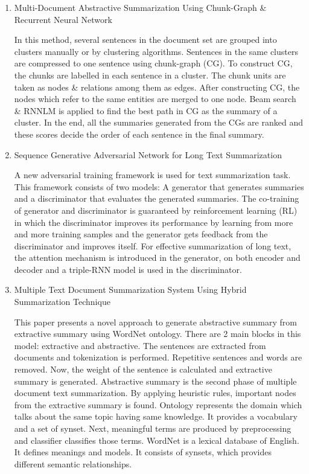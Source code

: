 \documentclass[11pt]{report}
\begin{document}
\begin{enumerate}
    \item Multi-Document Abstractive Summarization Using Chunk-Graph \& Recurrent Neural Network\cite{14}

    In this method, several sentences in the document set are grouped into clusters manually or by clustering algorithms. Sentences in the same clusters are compressed to one sentence using chunk-graph (CG). To construct CG, the chunks are labelled in each sentence in a cluster. The chunk units are taken as nodes \& relations among them as edges. After constructing CG, the nodes which refer to the same entities are merged to one node. Beam search \& RNNLM is applied to find the best path in CG as the summary of a cluster. In the end, all the summaries generated from the CGs are ranked and these scores decide the order of each sentence in the final summary. \\
    
    \item Sequence Generative Adversarial Network for Long Text Summarization\cite{15}

    A new adversarial training framework is used for text summarization task. This framework consists of two models: A generator that generates summaries and a discriminator that evaluates the generated summaries. The co-training of generator and discriminator is guaranteed by reinforcement learning (RL) in which the discriminator improves its performance by learning from more and more training samples and the generator gets feedback from the discriminator and improves itself. For effective summarization of long text, the attention mechanism is introduced in the generator, on both encoder and decoder and a triple-RNN model is used in the discriminator. \\

    \item Multiple Text Document Summarization System Using Hybrid Summarization Technique\cite{16}

    This paper presents a novel approach to generate abstractive summary from extractive summary using WordNet ontology. There are 2 main blocks in this model: extractive and abstractive. The sentences are extracted from documents and tokenization is performed. Repetitive sentences and words are removed. Now, the weight of the sentence is calculated and extractive summary is generated. Abstractive summary is the second phase of multiple document text summarization. By applying heuristic rules, important nodes from the extractive summary is found. Ontology represents the domain which talks about the same topic having same knowledge. It provides a vocabulary and a set of synset. Next, meaningful terms are produced by preprocessing and classifier classifies those terms. WordNet is a lexical database of English. It defines meanings and models. It consists of synsets, which provides different semantic relationships. \\
    

\end{enumerate}
\end{document}
